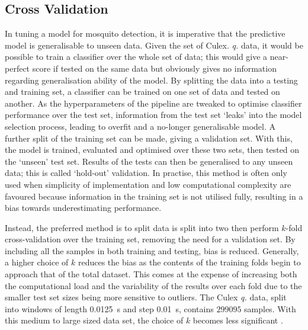        
    \subsection{Cross Validation}
    \label{subsec:exp-clf-xval}
        In tuning a model for mosquito detection, it is imperative that the predictive model is generalisable to unseen data. Given the set of Culex. \textit{q.} data, it would be possible to train a classifier over the whole set of data; this would give a near-perfect score if tested on the same data but obviously gives no information regarding generalisation ability of the model. By splitting the data into a testing and training set, a classifier can be trained on one set of data and tested on another. As the hyperparameters of the pipeline are tweaked to optimise classifier performance over the test set, information from the test set `leaks' into the model selection process, leading to overfit and a no-longer generalisable model. A further split of the training set can be made, giving a validation set. With this, the model is trained, evaluated and optimised over these two sets, then tested on the `unseen' test set. Results of the tests can then be generalised to any unseen data; this is called `hold-out' validation. In practise, this method is often only used when simplicity of implementation and low computational complexity are favoured because information in the training set is not utilised fully, resulting in a bias towards underestimating performance.
     
        Instead, the preferred method is to split data is split into two then perform $k$-fold cross-validation over the training set, removing the need for a validation set. By including all the samples in both training and testing, bias is reduced. Generally, a higher choice of $k$ reduces the bias as the contents of the training folds begin to approach that of the total dataset. This comes at the expense of increasing both the computational load and the variability of the results over each fold due to the smaller test set sizes being more sensitive to outliers. The Culex \textit{q.} data, split into windows of length \SI{0.0125}{\second} and step \SI{0.01}{\second}, contains $299095$ samples. With this medium to large sized data set, the choice of $k$ becomes less significant \cite{Kohavi1995}. 
        
